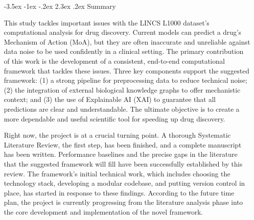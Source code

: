 \documentclass[12pt,a4paper]{article}
\makeatletter
\renewcommand\section{\@startsection{section}{1}{\z@}%
  {-3.5ex \@plus-1ex \@minus-.2ex}%
  {2.3ex \@plus.2ex}%
  {\normalfont\large\bfseries}}
\makeatother
\begin{document}
\section{Summary}

This study tackles important issues with the LINCS L1000 dataset's computational analysis for drug discovery. Current models can predict a drug's Mechanism of Action (MoA), but they are often inaccurate and unreliable against data noise to be used confidently in a clinical setting.  The primary contribution of this work is the development of a consistent, end-to-end computational framework that tackles these issues. Three key components support the suggested framework: (1) a strong pipeline for preprocessing data to reduce technical noise; (2) the integration of external biological knowledge graphs to offer mechanistic context; and (3) the use of Explainable AI (XAI) to guarantee that all predictions are clear and understandable. The ultimate objective is to create a more dependable and useful scientific tool for speeding up drug discovery.

Right now, the project is at a crucial turning point. A thorough Systematic Literature Review, the first step, has been finished, and a complete manuscript has been written.  Performance baselines and the precise gaps in the literature that the suggested framework will fill have been successfully established by this review.  The framework's initial technical work, which includes choosing the technology stack, developing a modular codebase, and putting version control in place, has started in response to these findings.  According to the future time plan, the project is currently progressing from the literature analysis phase into the core development and implementation of the novel framework.



\end{document}
